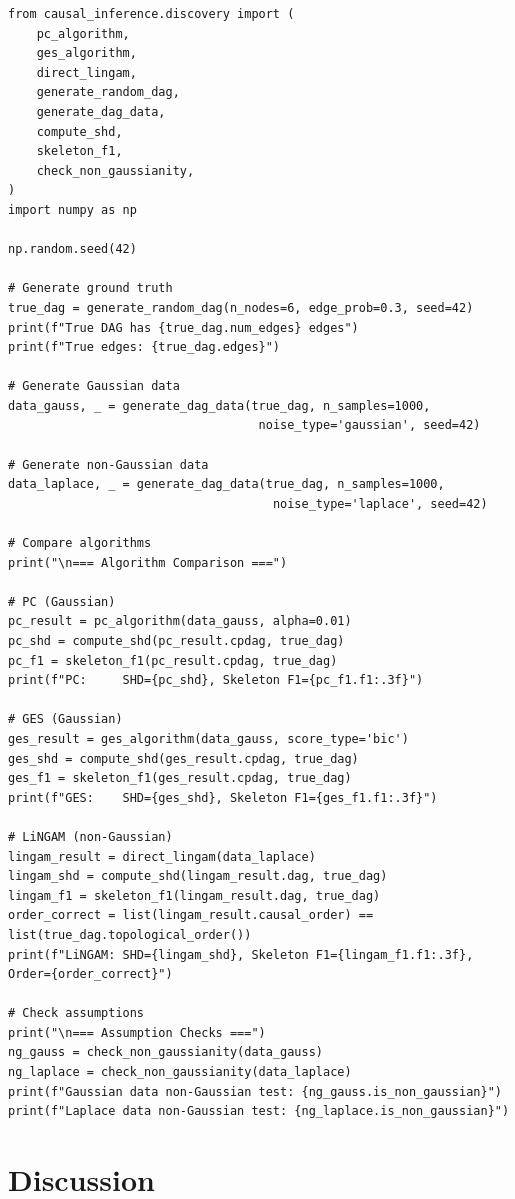 \begin{verbatim}
from causal_inference.discovery import (
    pc_algorithm,
    ges_algorithm,
    direct_lingam,
    generate_random_dag,
    generate_dag_data,
    compute_shd,
    skeleton_f1,
    check_non_gaussianity,
)
import numpy as np

np.random.seed(42)

# Generate ground truth
true_dag = generate_random_dag(n_nodes=6, edge_prob=0.3, seed=42)
print(f"True DAG has {true_dag.num_edges} edges")
print(f"True edges: {true_dag.edges}")

# Generate Gaussian data
data_gauss, _ = generate_dag_data(true_dag, n_samples=1000,
                                   noise_type='gaussian', seed=42)

# Generate non-Gaussian data
data_laplace, _ = generate_dag_data(true_dag, n_samples=1000,
                                     noise_type='laplace', seed=42)

# Compare algorithms
print("\n=== Algorithm Comparison ===")

# PC (Gaussian)
pc_result = pc_algorithm(data_gauss, alpha=0.01)
pc_shd = compute_shd(pc_result.cpdag, true_dag)
pc_f1 = skeleton_f1(pc_result.cpdag, true_dag)
print(f"PC:     SHD={pc_shd}, Skeleton F1={pc_f1.f1:.3f}")

# GES (Gaussian)
ges_result = ges_algorithm(data_gauss, score_type='bic')
ges_shd = compute_shd(ges_result.cpdag, true_dag)
ges_f1 = skeleton_f1(ges_result.cpdag, true_dag)
print(f"GES:    SHD={ges_shd}, Skeleton F1={ges_f1.f1:.3f}")

# LiNGAM (non-Gaussian)
lingam_result = direct_lingam(data_laplace)
lingam_shd = compute_shd(lingam_result.dag, true_dag)
lingam_f1 = skeleton_f1(lingam_result.dag, true_dag)
order_correct = list(lingam_result.causal_order) == list(true_dag.topological_order())
print(f"LiNGAM: SHD={lingam_shd}, Skeleton F1={lingam_f1.f1:.3f}, Order={order_correct}")

# Check assumptions
print("\n=== Assumption Checks ===")
ng_gauss = check_non_gaussianity(data_gauss)
ng_laplace = check_non_gaussianity(data_laplace)
print(f"Gaussian data non-Gaussian test: {ng_gauss.is_non_gaussian}")
print(f"Laplace data non-Gaussian test: {ng_laplace.is_non_gaussian}")
\end{verbatim}


\section{Discussion}

